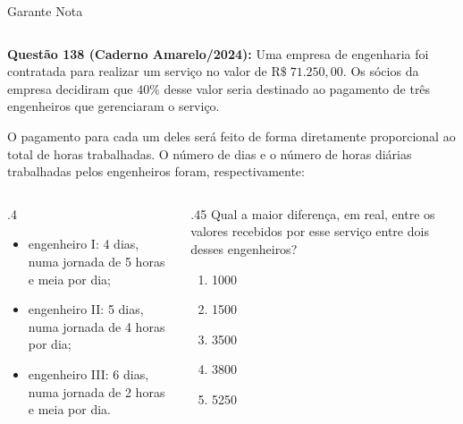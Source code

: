 \documentclass[aspectratio=169, t, 8pt]{beamer}
\begin{document}
    \begin{frame}{Garante Nota}
        \begin{columns}[totalwidth=.9\textwidth, T]
            \begin{column}{\textwidth}
                \textcolor{black!65}{\bf Questão 138 (Caderno Amarelo/2024):} Uma empresa de engenharia foi contratada para realizar um serviço no valor de $\text{R\$} \;71.250,00$. Os sócios da empresa decidiram que $40\%$ desse valor seria destinado ao pagamento de três engenheiros que gerenciaram o serviço.
                
                O pagamento para cada um deles será feito de forma diretamente proporcional ao total de horas trabalhadas. O número de dias e o número de horas diárias trabalhadas pelos engenheiros foram, respectivamente:
            \end{column}
        \end{columns}

        \vspace{1em}

        \begin{columns}[totalwidth=.9\textwidth, T]
            \begin{column}{.4\textwidth}
                \begin{itemize}[label=$\bullet$]
                    \item engenheiro I: 4 dias, numa jornada de 5 horas e meia por dia;
                    \item engenheiro II: 5 dias, numa jornada de 4 horas por dia;
                    \item engenheiro III: 6 dias, numa jornada de 2 horas e meia por dia.
                \end{itemize}
            \end{column}
            \begin{column}{.45\textwidth}
                Qual a maior diferença, em real, entre os valores recebidos por esse serviço entre dois desses engenheiros?
                \begin{enumerate}[label=\alph*.), font=\bfseries]
                    \item 1000
                    \item 1500
                    \item 3500
                    \item 3800
                    \item 5250
                \end{enumerate}
            \end{column}
        \end{columns}
    \end{frame}
\end{document}
